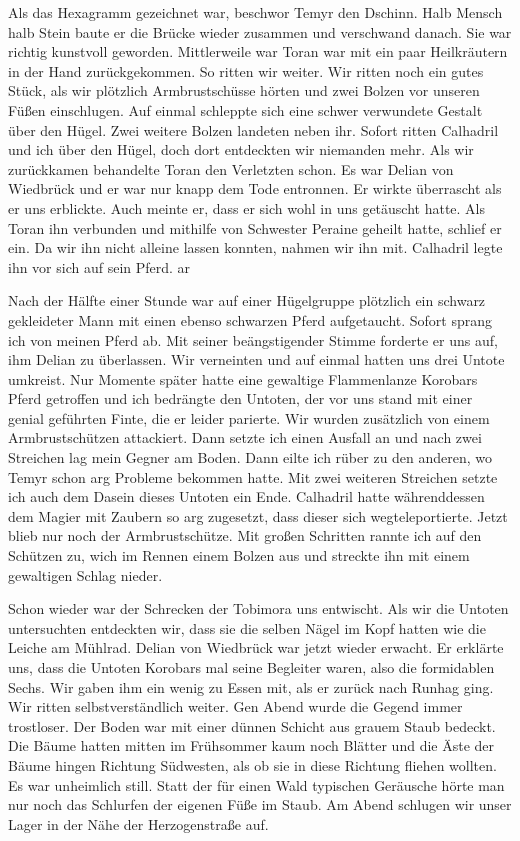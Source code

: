 Als das Hexagramm gezeichnet war, beschwor Temyr den Dschinn. Halb Mensch halb Stein baute er die Brücke wieder zusammen und verschwand danach. Sie war richtig kunstvoll geworden. Mittlerweile war Toran war mit ein paar Heilkräutern in der Hand zurückgekommen. So ritten wir weiter. Wir ritten noch ein gutes Stück, als wir plötzlich Armbrustschüsse hörten und zwei Bolzen vor unseren Füßen einschlugen. Auf einmal schleppte sich eine schwer verwundete Gestalt über den Hügel. Zwei weitere Bolzen landeten neben ihr. Sofort ritten Calhadril und ich über den Hügel, doch dort entdeckten wir niemanden mehr. Als wir zurückkamen behandelte Toran den Verletzten schon. Es war Delian von Wiedbrück und er war nur knapp dem Tode entronnen. Er wirkte überrascht als er uns erblickte. Auch meinte er, dass er sich wohl in uns getäuscht hatte. Als Toran ihn verbunden und mithilfe von Schwester Peraine geheilt hatte, schlief er ein. Da wir ihn nicht alleine lassen konnten, nahmen wir ihn mit. Calhadril legte ihn vor sich auf sein Pferd. ar

Nach der Hälfte einer Stunde war auf einer Hügelgruppe plötzlich ein schwarz gekleideter Mann mit einen ebenso schwarzen Pferd aufgetaucht. Sofort sprang ich von meinen Pferd ab. Mit seiner beängstigender Stimme forderte er uns auf, ihm Delian zu überlassen. Wir verneinten und auf einmal hatten uns drei Untote umkreist. Nur Momente später hatte eine gewaltige Flammenlanze Korobars Pferd getroffen und ich bedrängte den Untoten, der vor uns stand mit einer genial geführten Finte, die er leider parierte. Wir wurden zusätzlich von einem Armbrustschützen attackiert. Dann setzte ich einen Ausfall an und nach zwei Streichen lag mein Gegner am Boden. Dann eilte ich rüber zu den anderen, wo Temyr schon arg Probleme bekommen hatte. Mit zwei weiteren Streichen setzte ich auch dem Dasein dieses Untoten ein Ende. Calhadril hatte währenddessen dem Magier mit Zaubern so arg zugesetzt, dass dieser sich wegteleportierte. Jetzt blieb nur noch der Armbrustschütze. Mit großen Schritten rannte ich auf den Schützen zu, wich im Rennen einem Bolzen aus und streckte ihn mit einem gewaltigen Schlag nieder. 


Schon wieder war der Schrecken der Tobimora uns entwischt. Als wir die Untoten untersuchten entdeckten wir, dass sie die selben Nägel im Kopf hatten wie die Leiche am Mühlrad. Delian von Wiedbrück war jetzt wieder erwacht. Er erklärte uns, dass die Untoten Korobars mal seine Begleiter waren, also die formidablen Sechs. Wir gaben ihm ein wenig zu Essen mit, als er zurück nach Runhag ging. Wir ritten selbstverständlich weiter. Gen Abend wurde die Gegend immer trostloser. Der Boden war mit einer dünnen Schicht aus grauem Staub bedeckt. Die Bäume hatten mitten im Frühsommer kaum noch Blätter und die Äste der Bäume hingen Richtung Südwesten, als ob sie in diese Richtung fliehen wollten. Es war unheimlich still. Statt der für einen Wald typischen Geräusche hörte man nur noch das Schlurfen der eigenen Füße im Staub. Am Abend schlugen wir unser Lager in der Nähe der Herzogenstraße auf.

